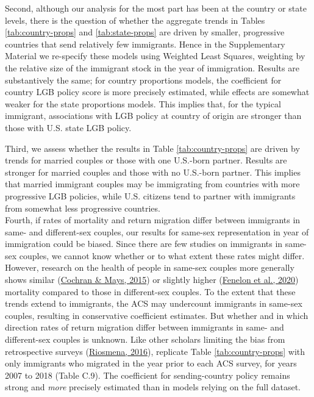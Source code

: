 \documentclass[
  12pt,
]{article}
\begin{document}
Second, although our analysis for the most part has been at the country or state levels, there is the question of whether the aggregate trends in Tables \ref{tab:country-props} and \ref{tab:state-props} are driven by smaller, progressive countries that send relatively few immigrants. Hence in the Supplementary Material we re-specify these models using Weighted Least Squares, weighting by the relative size of the immigrant stock in the year of immigration. Results are substantively the same; for country proportions models, the coefficient for country LGB policy score is more precisely estimated, while effects are somewhat weaker for the state proportions models. This implies that, for the typical immigrant, associations with LGB policy at country of origin are stronger than those with U.S. state LGB policy.

Third, we assess whether the results in Table \ref{tab:country-props} are driven by trends for married couples or those with one U.S.-born partner. Results are stronger for married couples and those with no U.S.-born partner. This implies that married immigrant couples may be immigrating from countries with more progressive LGB policies, while U.S. citizens tend to partner with immigrants from somewhat less progressive countries.\\

Fourth, if rates of mortality and return migration differ between immigrants in same- and different-sex couples, our results for same-sex representation in year of immigration could be biased. Since there are few studies on immigrants in same-sex couples, we cannot know whether or to what extent these rates might differ. However, research on the health of people in same-sex couples more generally shows similar (\protect\hyperlink{ref-cochran_2015_mortality}{Cochran \& Mays, 2015}) or slightly higher (\protect\hyperlink{ref-fenelon_2020_samesex}{Fenelon et al., 2020}) mortality compared to those in different-sex couples. To the extent that these trends extend to immigrants, the ACS may undercount immigrants in same-sex couples, resulting in conservative coefficient estimates. But whether and in which direction rates of return migration differ between immigrants in same- and different-sex couples is unknown. Like other scholars limiting the bias from retrospective surveys (\protect\hyperlink{ref-riosmena_2016_potential}{Riosmena, 2016}), replicate Table \ref{tab:country-props} with only immigrants who migrated in the year prior to each ACS survey, for years 2007 to 2018 (Table C.9). The coefficient for sending-country policy remains strong and \emph{more} precisely estimated than in models relying on the full dataset.
\end{document}
